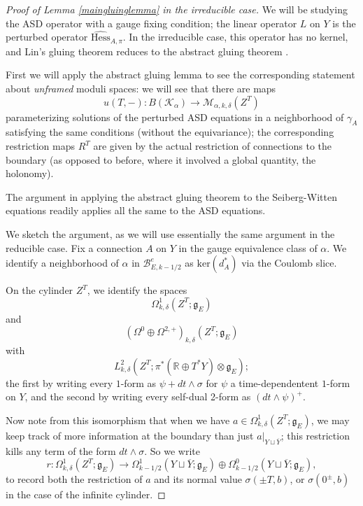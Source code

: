 \documentclass[10pt,a4paper]{amsart}
\theoremstyle{definition}
\theoremstyle{remark}
\numberwithin{figure}{qchap}
\begin{document}
\begin{proof}[Proof of Lemma \ref{maingluinglemma} in the irreducible case]We will be studying the ASD operator with a gauge fixing condition; the linear operator $L$ on $Y$ is the perturbed operator $\widehat{\text{Hess}}_{A, \pi}$. In the irreducible case, this operator has no kernel, and Lin's gluing theorem reduces to the abstract gluing theorem \cite[Theorem~18.3.5]{KMSW}.

First we will apply the abstract gluing lemma to see the corresponding statement about \emph{unframed} moduli spaces: we will see that there are maps
$$u(T, -): B(\mathcal K_\alpha) \to \mathcal M_{\alpha, k,\delta}(Z^T)$$ 
parameterizing solutions of the perturbed ASD equations in a neighborhood of $\gamma_A$ satisfying the same conditions (without the equivariance); the corresponding restriction maps $R^T$ are given by the actual restriction of connections to the boundary (as opposed to before, where it involved a global quantity, the holonomy).

The argument in \cite[Section~18.4]{KMSW} applying the abstract gluing theorem to the Seiberg-Witten equations readily applies all the same to the ASD equations.

We sketch the argument, as we will use essentially the same argument in the reducible case. Fix a connection $A$ on $Y$ in the gauge equivalence class of $\alpha$. We identify a neighborhood of $\alpha$ in $\mathcal B^e_{E,k-1/2}$ as $\text{ker}(d_A^*)$ via the Coulomb slice.

On the cylinder $Z^T$, we identify the spaces $$\Omega^1_{k,\delta}(Z^T;\mathfrak g_E)$$ and $$\left(\Omega^0 \oplus \Omega^{2,+}\right)_{k,\delta}(Z^T;\mathfrak g_E)$$ with $$L^2_{k,\delta}(Z^T;\pi^* \! (\mathbb R \oplus T^*Y) \otimes \mathfrak g_E);$$ the first by writing every $1$-form as $\psi + dt \wedge \sigma$ for $\psi$ a time-dependentent $1$-form on $Y$, and the second by writing every self-dual 2-form as $(dt \wedge \psi)^+$.

Now note from this isomorphism that when we have $a \in \Omega^1_{k,\delta}(Z^T;\mathfrak g_E)$, we may keep track of more information at the boundary than just $a \big|_{Y \sqcup \overline Y}$; this restriction kills any term of the form $dt \wedge \sigma$. So we write $$r: \Omega^1_{k,\delta}(Z^T;\mathfrak g_E) \to \Omega^1_{k-1/2}(Y \sqcup \overline Y; \mathfrak g_E) \oplus \Omega^0_{k-1/2}(Y \sqcup \overline Y; \mathfrak g_E),$$ to record both the restriction of $a$ and its normal value $\sigma(\pm T,b)$, or $\sigma(0^\pm,b)$ in the case of the infinite cylinder.


\end{proof}
\end{document}
